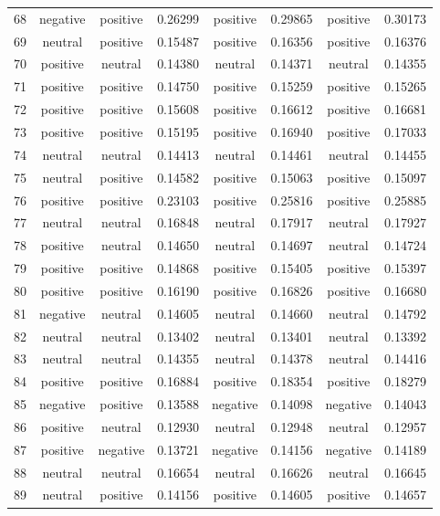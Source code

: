 \begin{center}
\begin{footnotesize}
\begin{longtable}{cc | cc | cc | cc}
68 & negative & positive & 0.26299 & positive & 0.29865 & positive & 0.30173 \\
69 & neutral & positive & 0.15487 & positive & 0.16356 & positive & 0.16376 \\
70 & positive & neutral & 0.14380 & neutral & 0.14371 & neutral & 0.14355 \\
71 & positive & positive & 0.14750 & positive & 0.15259 & positive & 0.15265 \\
72 & positive & positive & 0.15608 & positive & 0.16612 & positive & 0.16681 \\
73 & positive & positive & 0.15195 & positive & 0.16940 & positive & 0.17033 \\
74 & neutral & neutral & 0.14413 & neutral & 0.14461 & neutral & 0.14455 \\
75 & neutral & positive & 0.14582 & positive & 0.15063 & positive & 0.15097 \\
76 & positive & positive & 0.23103 & positive & 0.25816 & positive & 0.25885 \\
77 & neutral & neutral & 0.16848 & neutral & 0.17917 & neutral & 0.17927 \\
78 & positive & neutral & 0.14650 & neutral & 0.14697 & neutral & 0.14724 \\
79 & positive & positive & 0.14868 & positive & 0.15405 & positive & 0.15397 \\
80 & positive & positive & 0.16190 & positive & 0.16826 & positive & 0.16680 \\
81 & negative & neutral & 0.14605 & neutral & 0.14660 & neutral & 0.14792 \\
82 & neutral & neutral & 0.13402 & neutral & 0.13401 & neutral & 0.13392 \\
83 & neutral & neutral & 0.14355 & neutral & 0.14378 & neutral & 0.14416 \\
84 & positive & positive & 0.16884 & positive & 0.18354 & positive & 0.18279 \\
85 & negative & positive & 0.13588 & negative & 0.14098 & negative & 0.14043 \\
86 & positive & neutral & 0.12930 & neutral & 0.12948 & neutral & 0.12957 \\
87 & positive & negative & 0.13721 & negative & 0.14156 & negative & 0.14189 \\
88 & neutral & neutral & 0.16654 & neutral & 0.16626 & neutral & 0.16645 \\
89 & neutral & positive & 0.14156 & positive & 0.14605 & positive & 0.14657 \\

\end{longtable}
\end{footnotesize}
\end{center}
